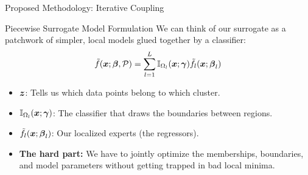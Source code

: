 \begin{frame}{Proposed Methodology: Iterative Coupling}
    \begin{block}{Piecewise Surrogate Model Formulation}
        We can think of our surrogate as a patchwork of simpler, local models glued together by a classifier:
        \begin{equation}
            \tilde{f}(\boldsymbol{x}; \boldsymbol{\beta}, \mathcal{P}) = \sum_{l=1}^L \mathbb{I}_{\Omega_l}(\boldsymbol{x}; \boldsymbol{\gamma}) \tilde{f}_l(\boldsymbol{x}; \boldsymbol{\beta}_l)
        \end{equation}
    \end{block}
    \vspace{0.2cm}
    \begin{itemize}
        \item $\boldsymbol{z}$: Tells us which data points belong to which cluster.
        \item $\mathbb{I}_{\Omega_l}(\boldsymbol{x}; \boldsymbol{\gamma})$: The classifier that draws the boundaries between regions.
        \item $\tilde{f}_l(\boldsymbol{x}; \boldsymbol{\beta}_l)$: Our localized experts (the regressors).
        \item \textbf{The hard part:} We have to jointly optimize the memberships, boundaries, and model parameters without getting trapped in bad local minima.
    \end{itemize}
\end{frame}

